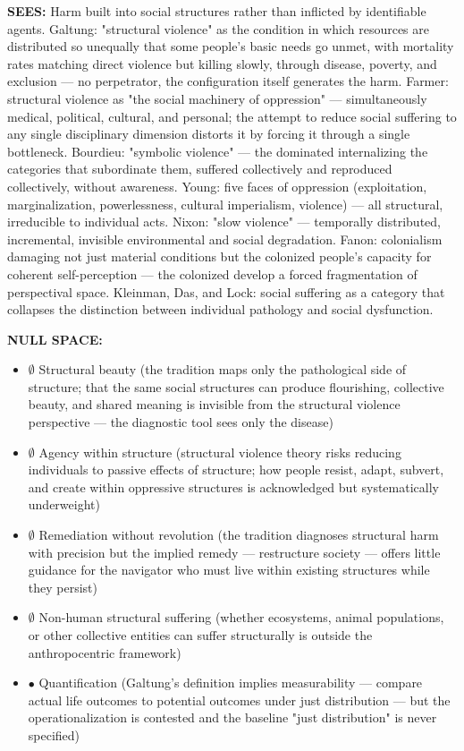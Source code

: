 \textbf{SEES:} Harm built into social structures rather than inflicted by identifiable agents. Galtung: "structural violence" as the condition in which resources are distributed so unequally that some people's basic needs go unmet, with mortality rates matching direct violence but killing slowly, through disease, poverty, and exclusion — no perpetrator, the configuration itself generates the harm. Farmer: structural violence as "the social machinery of oppression" — simultaneously medical, political, cultural, and personal; the attempt to reduce social suffering to any single disciplinary dimension distorts it by forcing it through a single bottleneck. Bourdieu: "symbolic violence" — the dominated internalizing the categories that subordinate them, suffered collectively and reproduced collectively, without awareness. Young: five faces of oppression (exploitation, marginalization, powerlessness, cultural imperialism, violence) — all structural, irreducible to individual acts. Nixon: "slow violence" — temporally distributed, incremental, invisible environmental and social degradation. Fanon: colonialism damaging not just material conditions but the colonized people's capacity for coherent self-perception — the colonized develop a forced fragmentation of perspectival space. Kleinman, Das, and Lock: social suffering as a category that collapses the distinction between individual pathology and social dysfunction.


\textbf{NULL SPACE:}

\begin{itemize}[nosep,leftmargin=*]
  \item $\emptyset$ Structural beauty (the tradition maps only the pathological side of structure; that the same social structures can produce flourishing, collective beauty, and shared meaning is invisible from the structural violence perspective — the diagnostic tool sees only the disease)
  \item $\emptyset$ Agency within structure (structural violence theory risks reducing individuals to passive effects of structure; how people resist, adapt, subvert, and create within oppressive structures is acknowledged but systematically underweight)
  \item $\emptyset$ Remediation without revolution (the tradition diagnoses structural harm with precision but the implied remedy — restructure society — offers little guidance for the navigator who must live within existing structures while they persist)
  \item $\emptyset$ Non-human structural suffering (whether ecosystems, animal populations, or other collective entities can suffer structurally is outside the anthropocentric framework)
  \item $\bullet$ Quantification (Galtung's definition implies measurability — compare actual life outcomes to potential outcomes under just distribution — but the operationalization is contested and the baseline "just distribution" is never specified)
\end{itemize}



